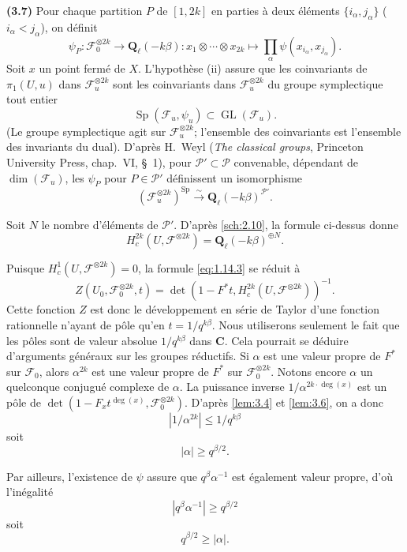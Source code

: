 \documentclass[12pt,a4paper]{amsart}
\theoremstyle{plain}
\theoremstyle{definition}
\theoremstyle{remark}
\DeclareMathOperator{\Sp}{Sp}
\DeclareMathOperator{\GL}{GL}
\newcommand{\Q}{\mathbf{Q}}
\newcommand{\C}{\mathbf{C}}
\numberwithin{equation}{section}
\begin{document}
\noindent \textbf{(3.7)} Pour chaque partition $P$ de $[1,2k]$ en parties \`a deux \'el\'ements $\{i_\alpha,j_\alpha\}$ ($i_\alpha<j_\alpha$), on d\'efinit
\[
\psi_P : \mathscr{F}_0^{\otimes 2k} \longrightarrow \Q_\ell(-k\beta) : x_1\otimes\cdots\otimes x_{2k} \mapsto \prod_\alpha \psi(x_{i_\alpha},x_{j_\alpha}).
\]
Soit $x$ un point ferm\'e de $X$. L'hypoth\`ese (ii) assure que les coinvariants de $\pi_1(U,u)$ dans $\mathscr{F}_u^{\otimes 2k}$ sont les coinvariants dans $\mathscr{F}_u^{\otimes 2k}$ du groupe symplectique tout entier
\[
\Sp(\mathscr{F}_u,\psi_u) \subset \GL(\mathscr{F}_u).
\]
(Le groupe symplectique agit sur $\mathscr{F}_u^{\otimes 2k}$; l'ensemble des coinvariants est l'ensemble des invariants du dual). D'apr\`es H.\ Weyl (\textit{The classical groups}, Princeton University Press, chap.\ VI, \S\ 1), pour $\mathscr{P}'\subset\mathscr{P}$ convenable, d\'ependant de $\dim(\mathscr{F}_u)$, les $\psi_P$ pour $P\in\mathscr{P}'$ d\'efinissent un isomorphisme
\[
(\mathscr{F}_u^{\otimes 2k})^{\Sp} \xrightarrow{\sim} \Q_\ell(-k\beta)^{\mathscr{P}'}.
\]

Soit $N$ le nombre d'\'el\'ements de $\mathscr{P}'$. D'apr\`es \eqref{sch:2.10}, la formule ci-dessus donne
\[
H^{2k}_c(U,\mathscr{F}^{\otimes 2k}) = \Q_\ell(-k\beta)^{\oplus N}.
\]

Puisque $H^1_c(U,\mathscr{F}^{\otimes 2k})=0$, la formule \eqref{eq:1.14.3} se r\'eduit \`a
\[
Z(U_0,\mathscr{F}_0^{\otimes 2k},t) = \det(1-F^*t,H^{2k}_c(U,\mathscr{F}^{\otimes 2k}))^{-1}.
\]
Cette fonction $Z$ est donc le d\'eveloppement en s\'erie de Taylor d'une fonction rationnelle n'ayant de p\^ole qu'en $t=1/q^{k\beta}$. Nous utiliserons seulement le fait que les p\^oles sont de valeur absolue $1/q^{k\beta}$ dans $\C$. Cela pourrait se d\'eduire d'arguments g\'en\'eraux sur les groupes r\'eductifs. Si $\alpha$ est une valeur propre de $F^*$ sur $\mathscr{F}_0$, alors $\alpha^{2k}$ est une valeur propre de $F^*$ sur $\mathscr{F}_0^{\otimes 2k}$. Notons encore $\alpha$ un quelconque conjugu\'e complexe de $\alpha$. La puissance inverse $1/\alpha^{2k\cdot\deg(x)}$ est un p\^ole de $\det(1-F_x t^{\deg(x)},\mathscr{F}_0^{\otimes 2k})$. D'apr\`es \eqref{lem:3.4} et \eqref{lem:3.6}, on a donc
\[
|1/\alpha^{2k}| \le 1/q^{k\beta}
\]
soit
\[
|\alpha| \ge q^{\beta/2}.
\]

Par ailleurs, l'existence de $\psi$ assure que $q^\beta\alpha^{-1}$ est \'egalement valeur propre, d'o\`u l'in\'egalit\'e
\[
|q^\beta\alpha^{-1}| \ge q^{\beta/2}
\]
soit
\[
q^{\beta/2} \ge |\alpha|.
\]
\end{document}
